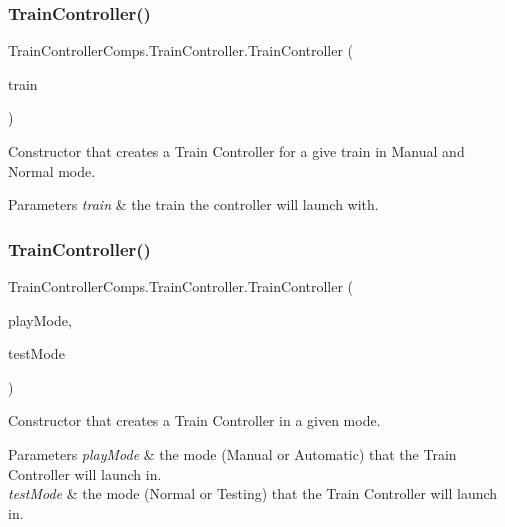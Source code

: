\subsubsection{\texorpdfstring{Train\+Controller()}{TrainController()}\hspace{0.1cm}{\footnotesize\ttfamily [2/4]}}
{\footnotesize\ttfamily Train\+Controller\+Comps.\+Train\+Controller.\+Train\+Controller (\begin{DoxyParamCaption}\item[{\hyperlink{classTrainControllerComps_1_1TestTrain}{Test\+Train}}]{train }\end{DoxyParamCaption})}



Constructor that creates a Train Controller for a give train in Manual and Normal mode. 


\begin{DoxyParams}{Parameters}
{\em train} & the train the controller will launch with. \\
\hline
\end{DoxyParams}
\mbox{\label{classTrainControllerComps_1_1TrainController_aff04f9677f4ac86f806e8a909bf9d511}} 
\subsubsection{\texorpdfstring{Train\+Controller()}{TrainController()}\hspace{0.1cm}{\footnotesize\ttfamily [3/4]}}
{\footnotesize\ttfamily Train\+Controller\+Comps.\+Train\+Controller.\+Train\+Controller (\begin{DoxyParamCaption}\item[{String}]{play\+Mode,  }\item[{String}]{test\+Mode }\end{DoxyParamCaption})}



Constructor that creates a Train Controller in a given mode. 


\begin{DoxyParams}{Parameters}
{\em play\+Mode} & the mode (Manual or Automatic) that the Train Controller will launch in. \\
\hline
{\em test\+Mode} & the mode (Normal or Testing) that the Train Controller will launch in. \\
\hline
\end{DoxyParams}
\mbox{\label{classTrainControllerComps_1_1TrainController_a95ed9487bd1f1511c0718a13caa1d573}} 
